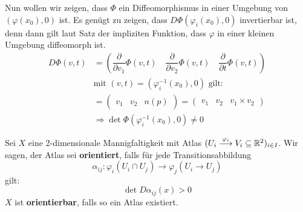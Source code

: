 \documentclass[main.tex]{subfiles}
\begin{document}
\begin{Beweis}
  Nun wollen wir zeigen, dass $\Phi$ ein Diffeomorphismus in einer Umgebung von $(\varphi(x_0),0)$ ist. Es genügt zu zeigen, dass $D \Phi (\varphi_i(x_0),0)$ invertierbar ist, denn dann gilt laut Satz der impliziten Funktion, dass $\varphi$ in einer kleinen Umgebung diffeomorph ist.
  $$\begin{aligned}
    D \Phi(v,t) & = \left(\dfrac{\partial}{\partial v_1} \Phi(v,t) \quad \dfrac{\partial}{\partial v_2} \Phi(v,t) \quad \dfrac{\partial}{\partial t} \Phi(v,t)\right) \\
    & \text{mit }(v,t) = (\varphi_i^{-1}(x_0),0) \text{ gilt:}\\
    & = \begin{pmatrix}
      v_1 & v_2 & n(p)
    \end{pmatrix} = \begin{pmatrix}
      v_1 & v_2 & v_1 \times v_2
    \end{pmatrix} \\
    & \Rightarrow \det \Phi(\varphi_i^{-1}(x_0),0) \neq 0
  \end{aligned}$$
\end{Beweis}

\begin{Definition}[Orientierung]
  Sei $X$ eine 2-dimensionale Mannigfaltigkeit mit Atlas $(U_i \stackrel{\varphi_i}{\longrightarrow} V_i \subseteq \mathbb{R}^2)_{i \in I}$. Wir sagen, der Atlas sei \textbf{orientiert}, falls für jede Transitionsabbildung
  $$\alpha_{ij}: \varphi_i(U_i \cap U_j) \to \varphi_j(U_i \to U_j)$$
  gilt:
  $$\det D\alpha_{ij}(x) > 0$$
  $X$ ist \textbf{orientierbar}, falls so ein Atlas existiert.
\end{Definition}
\end{document}
